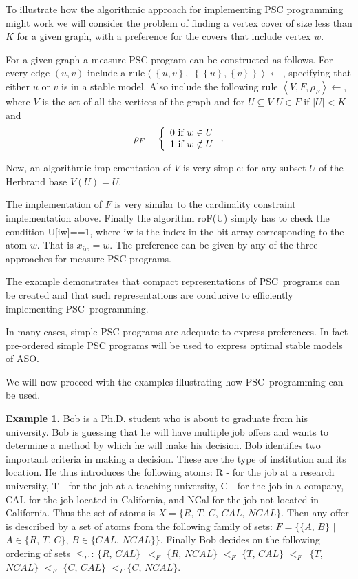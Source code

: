 \documentclass[letterpaper]{article}\usepackage{aaai}
\begin{document}
To illustrate how the algorithmic approach for implementing PSC programming
might work we will consider the problem of finding a vertex cover of size less
than $K$ for a given graph, with a preference for the covers that include
vertex $w$.

For a given graph a measure PSC program can be constructed as follows. For
every edge $\left(  u,v\right)  $ include a rule$\left\langle \left\{
u,v\right\}  ,\;\left\{  \left\{  u\right\}  ,\left\{  v\right\}  \right\}
\right\rangle \leftarrow$, specifying that either $u$ or $v$ is in a stable
model. Also include the following rule $\left\langle V,F,\rho_{F}\right\rangle
\leftarrow$, where $V$ is the set of all the vertices of the graph and for
$U\subseteq V$ $U\in F$ if $\left\vert U\right\vert <K$ and
\[
\rho_{F}=\left\{
\begin{array}
[c]{l}0\text{ if }w\in U\\
1\text{ if }w\notin U
\end{array}
\right.  .
\]


Now, an algorithmic implementation of $V$ is very simple: for any subset $U$
of the Herbrand base $V\left(  U\right)  =U$.

The implementation of $F$ is very similar to the cardinality constraint
implementation above. Finally the algorithm roF(U) simply has to check the
condition U[iw]==1, where iw is the index in the bit array corresponding to
the atom $w$. That is $x_{iw}=w$. The preference can be given by any of the
three approaches for measure PSC programs.

The example demonstrates that compact representations of PSC\ programs can be
created and that such representations are conducive to efficiently
implementing PSC\ programming.

\bigskip

In many cases, simple PSC programs are adequate to express preferences. In
fact pre-ordered simple PSC programs will be used to express optimal stable
models of ASO.

We will now proceed with the examples illustrating how PSC\ programming can be used.

\textbf{Example 1.}\label{Ex1} Bob is a Ph.D. student who is about to graduate
from his university. Bob is guessing that he will have multiple job offers and
wants to determine a method by which he will make his decision. Bob identifies
two important criteria in making a decision. These are the type of institution
and its location. He thus introduces the following atoms: R - for the job at a
research university, T - for the job at a teaching university, C - for the job
in a company, CAL-for the job located in California, and NCal-for the job not
located in California. Thus the set of atoms is $X=\{R$, $T$, $C$, $CAL$,
$NCAL\}$. Then any offer is described by a set of atoms from the following
family of sets: $F=\{\{A$, $B\}$ $|$ $A\in\{R$, $T$, $C\}$, $B\in\{CAL$,
$NCAL\}\}$. Finally Bob decides on the following ordering of sets $\leq_{F}$:
$\{R$, $CAL\}$\ $<_{F}$ $\{R$, $NCAL\}$ $<_{F}$ $\{T$, $CAL\}$ $<_{F}$\ $\{T$,
$NCAL\}$ $<_{F}$ $\{C$, $CAL\}$ $<_{F}\{C$, $NCAL\}$.
\end{document}
